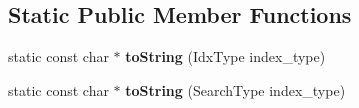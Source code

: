\subsection*{Static Public Member Functions}
\begin{DoxyCompactItemize}
\item 
\hypertarget{structFLANNParams_a7d1d264e68d6fbc400a93a2f0f37e08e}{static const char $\ast$ {\bfseries to\-String} (Idx\-Type index\-\_\-type)}\label{structFLANNParams_a7d1d264e68d6fbc400a93a2f0f37e08e}

\item 
\hypertarget{structFLANNParams_adf2cebef4c73ae9a1264feffefb160bd}{static const char $\ast$ {\bfseries to\-String} (Search\-Type index\-\_\-type)}\label{structFLANNParams_adf2cebef4c73ae9a1264feffefb160bd}

\end{DoxyCompactItemize}
